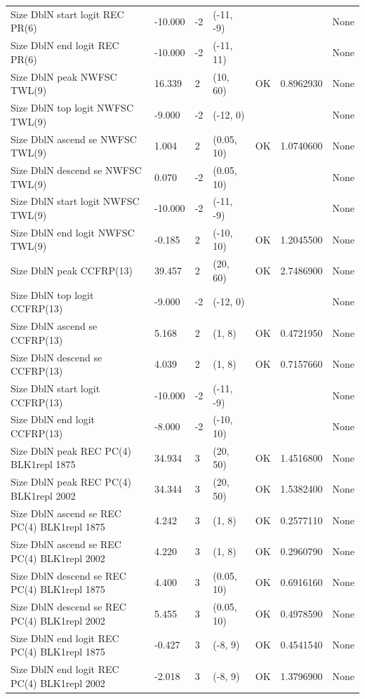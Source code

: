 \documentclass[
  english,
  a4paper,
]{article}
\begin{document}
\begin{landscape}
\begin{longtable}[t]{>{\raggedright\arraybackslash}p{8.5cm}lllll>{\raggedright\arraybackslash}p{4cm}}
Size DblN start logit REC PR(6) & -10.000 & -2 & (-11, -9) &  &  & None\\
Size DblN end logit REC PR(6) & -10.000 & -2 & (-11, 11) &  &  & None\\
Size DblN peak NWFSC TWL(9) & 16.339 & 2 & (10, 60) & OK & 0.8962930 & None\\
Size DblN top logit NWFSC TWL(9) & -9.000 & -2 & (-12, 0) &  &  & None\\
Size DblN ascend se NWFSC TWL(9) & 1.004 & 2 & (0.05, 10) & OK & 1.0740600 & None\\
Size DblN descend se NWFSC TWL(9) & 0.070 & -2 & (0.05, 10) &  &  & None\\
Size DblN start logit NWFSC TWL(9) & -10.000 & -2 & (-11, -9) &  &  & None\\
Size DblN end logit NWFSC TWL(9) & -0.185 & 2 & (-10, 10) & OK & 1.2045500 & None\\
Size DblN peak CCFRP(13) & 39.457 & 2 & (20, 60) & OK & 2.7486900 & None\\
Size DblN top logit CCFRP(13) & -9.000 & -2 & (-12, 0) &  &  & None\\
Size DblN ascend se CCFRP(13) & 5.168 & 2 & (1, 8) & OK & 0.4721950 & None\\
Size DblN descend se CCFRP(13) & 4.039 & 2 & (1, 8) & OK & 0.7157660 & None\\
Size DblN start logit CCFRP(13) & -10.000 & -2 & (-11, -9) &  &  & None\\
Size DblN end logit CCFRP(13) & -8.000 & -2 & (-10, 10) &  &  & None\\
Size DblN peak REC PC(4) BLK1repl 1875 & 34.934 & 3 & (20, 50) & OK & 1.4516800 & None\\
Size DblN peak REC PC(4) BLK1repl 2002 & 34.344 & 3 & (20, 50) & OK & 1.5382400 & None\\
Size DblN ascend se REC PC(4) BLK1repl 1875 & 4.242 & 3 & (1, 8) & OK & 0.2577110 & None\\
Size DblN ascend se REC PC(4) BLK1repl 2002 & 4.220 & 3 & (1, 8) & OK & 0.2960790 & None\\
Size DblN descend se REC PC(4) BLK1repl 1875 & 4.400 & 3 & (0.05, 10) & OK & 0.6916160 & None\\
Size DblN descend se REC PC(4) BLK1repl 2002 & 5.455 & 3 & (0.05, 10) & OK & 0.4978590 & None\\
Size DblN end logit REC PC(4) BLK1repl 1875 & -0.427 & 3 & (-8, 9) & OK & 0.4541540 & None\\
Size DblN end logit REC PC(4) BLK1repl 2002 & -2.018 & 3 & (-8, 9) & OK & 1.3796900 & None\\

\end{longtable}
\end{landscape}
\end{document}
